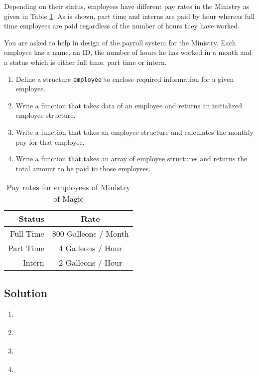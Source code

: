 \documentclass[12pt,letterpaper,twoside]{article}
\begin{document}
Depending on their status, employees have different pay rates in the Ministry as given in Table \ref{tablequestion5}.
As is shown, part time and interns are paid by hour whereas full time employees are paid regardless of the number of hours they have worked.

You are asked to help in design of the payroll system for the Ministry.
Each employee has a name, an ID, the number of hours he has worked in a month and a status which is either full time, part time or intern.

\begin{enumerate}
\item Define a structure \texttt{employee} to enclose required information for a given employee.
\item Write a function that takes data of an employee and returns an initialized employee structure.
\item Write a function that takes an employee structure and calculates the monthly pay for that employee.
\item Write a function that takes an array of employee structures and returns the total amount to be paid to those employees.
\end{enumerate}

\begin{table}[H] \centering
\begin{tabular}{r c}
\textbf{Status} & \textbf{Rate}\\
\hline
Full Time & 800 Galleons / Month\\
Part Time & 4 Galleons / Hour\\
Intern & 2 Galleons / Hour
\end{tabular}
\caption{Pay rates for employees of Ministry of Magic}
\label{tablequestion5}
\end{table}

\subsection*{Solution}

\begin{enumerate}
\item \lstinline{}

\item \lstinline{}

\item \lstinline{}

\item \lstinline{}

\end{enumerate}
\end{document}
